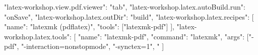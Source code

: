 {
  "latex-workshop.view.pdf.viewer": "tab",
  "latex-workshop.latex.autoBuild.run": "onSave",
  "latex-workshop.latex.outDir": "build",
  "latex-workshop.latex.recipes": [
    {
      "name": "latexmk (pdflatex)",
      "tools": ["latexmk-pdf"]
    }
  ],
  "latex-workshop.latex.tools": [
    {
      "name": "latexmk-pdf",
      "command": "latexmk",
      "args": ["-pdf", "-interaction=nonstopmode", "-synctex=1", "%
    }
  ]
}
